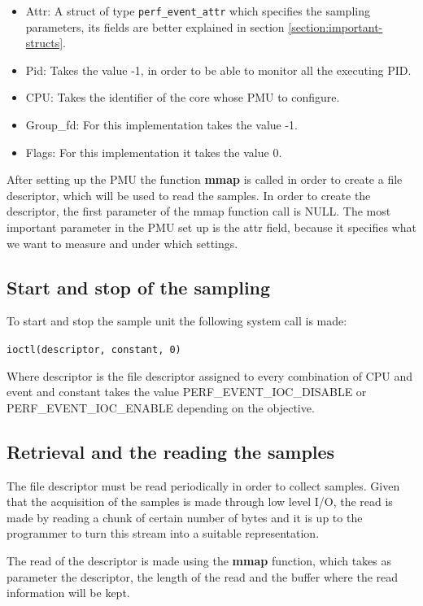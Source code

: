 \begin{itemize}
	\item Attr: A struct of type \texttt{perf\_event\_attr} which specifies the sampling parameters, its fields are better explained in section \ref{section:important-structs}. 
	\item Pid: Takes the value -1, in order to be able to monitor all the executing PID.
	\item CPU: Takes the identifier of the core whose PMU to configure.
	\item Group\_fd: For this implementation takes the value -1.
	\item Flags: For this implementation it takes the value 0.
\end{itemize}

After setting up the PMU the function \textbf{mmap} is called in order to create a file descriptor, which will be used to read the samples. In order to create the descriptor, the first parameter of the mmap function call is NULL. The most important parameter in the PMU set up is the attr field, because it specifies what we want to measure and under which settings.  

\subsection{Start and stop of the sampling}\label{section:start-sto}

To start and stop the sample unit the following system call is made: 
\\
\begin{center}
\texttt{ioctl(descriptor, constant, 0)}
\end{center}
Where descriptor is the file descriptor assigned to every combination of CPU and event and constant takes the value PERF\_EVENT\_IOC\_DISABLE or PERF\_EVENT\_IOC\_ENABLE depending on the objective.


\subsection{Retrieval and the reading the samples}\label{section:retr-reaf}

The file descriptor must be read periodically in order to collect samples. Given that the acquisition of the samples is made through low level I/O, the read is made by reading a chunk of certain number of bytes and it is up to the programmer to turn this stream into a suitable representation. 

The read of the descriptor is made using the \textbf{mmap} function, which takes as parameter the descriptor, the length of the read and the buffer where the read information will be kept.

